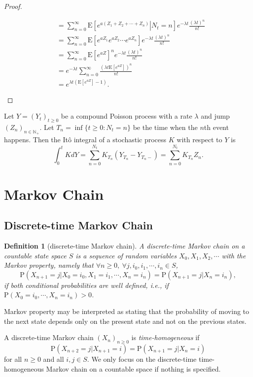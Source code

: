 \documentclass{article}
\newtheorem{definition}{Definition}[section]
\theoremstyle{nonumberplain}
\newtheorem{proof}{Proof.}
\begin{document}
\begin{proof}
\begin{enumerate}
\[\begin{aligned}
	&=\sum_{n=0}^{\infty}\mathrm{E}\left[\left.e^{a\left(Z_1+Z_2+\cdots+Z_{n}\right)}\right|N_t=n\right]e^{-\lambda t}\frac{\left(\lambda t\right)^n}{n!}\\
	&=\sum_{n=0}^{\infty}\mathrm{E}\left[e^{aZ_1}e^{aZ_2}\cdots e^{aZ_{n}}\right]e^{-\lambda t}\frac{\left(\lambda t\right)^n}{n!}\\
	&=\sum_{n=0}^{\infty}\mathrm{E}\left[e^{aZ}\right]^ne^{-\lambda t}\frac{\left(\lambda t\right)^n}{n!}\\
	&=e^{-\lambda t}\sum_{n=0}^{\infty}\frac{\left(\lambda t\mathrm{E}\left[e^{aZ}\right]\right)^n}{n!}\\
	&=e^{\lambda t\left(\mathrm{E}\left[e^{aZ}\right]-1\right)}.
 	\end{aligned}
 	\]
\end{enumerate}
\end{proof}
Let $Y=(Y_t)_{t\ge 0}$ be a compound Poisson process with a rate $\lambda$ and jump $(Z_n)_{n\in \mathbb{N}_+}$. Let $T_n=\inf\{t\ge0:N_t= n\}$ be the time when the $n$th event happens. Then the Itô integral of a stochastic process $K$ with respect to $Y$ is
\[
\int_{0}^{t}KdY=\sum_{n=0}^{N_t}K_{T_n}(Y_{T_n}-Y_{T_n-})=\sum_{n=0}^{N_t}K_{T_n}Z_n.
\]


\section{Markov Chain}
\subsection{Discrete-time Markov Chain}
\begin{definition}[discrete-time Markov chain]
	A \emph{discrete-time Markov chain} on a countable state space $S$ is a sequence of random variables $X_0, X_1, X_2,\cdots$ with the Markov property, namely that $\forall n\ge0,\ \forall j,i_0,i_1,\cdots,i_n\in S$,	
	\[
	\mathrm{P}(X_{n+1}=j| X_{0}=i_{0},X_{1}=i_{1},\cdots,X_{n}=i_{n})=\mathrm{P}(X_{n+1}=j| X_{n}=i_{n}), 
	\] if both conditional probabilities are well defined, i.e., if $ 	\mathrm{P}(X_{0}=i_{0},\cdots ,X_{n}=i_{n})>0$.
\end{definition}	
Markov property may be interpreted as stating that the probability of moving to the next state depends only on the present state and not on the previous states. 

\noindent A discrete-time Markov chain $(X_n)_{n\ge0}$ is \emph{time-homogeneous} if
\[
\mathrm{P}(X_{n+2}=j| X_{n+1}=i)=\mathrm{P}(X_{n+1}=j| X_{n}=i)
\]
for all $n\ge0$ and all $i,j\in S$. We only focus on the discrete-time time-homogeneous Markov chain on a countable space if nothing is specified. 
\end{document}
